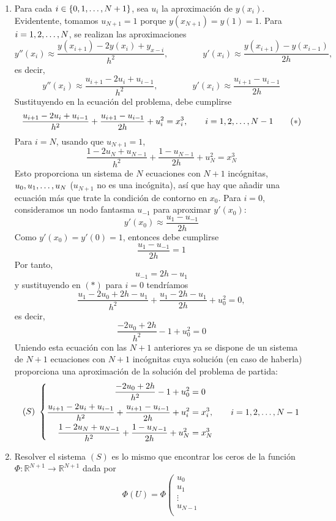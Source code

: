 \documentclass[11pt]{report}
\newcommand{\R}{\mathbb R}
\begin{document}
\begin{enumerate}
  \item  Para cada $i \in \{0,1,\mathellipsis,N+1\}$, sea $u_i$ la aproximación de $y(x_i)$. Evidentente, tomamos $u_{N+1}=1$ porque $y(x_{N+1})=y(1)=1$. Para $i =1,2,\mathellipsis,N$, se realizan las aproximaciones
  \[y''(x_i) \approx \frac{y(x_{i+1})-2y(x_i)+y_{x-i}}{h^2}, \qquad \qquad y'(x_i) \approx \frac{y(x_{i+1})-y(x_{i-1})}{2h},\]
  es decir,
  \[y''(x_i) \approx \frac{u_{i+1}-2u_i+u_{i-1}}{h^2}, \qquad \qquad y'(x_i) \approx \frac{u_{i+1}-u_{i-1}}{2h}\]
  Sustituyendo en la ecuación del problema, debe cumplirse
  \[\frac{u_{i+1}-2u_i+u_{i-1}}{h^2} + \frac{u_{i+1}-u_{i-1}}{2h} + u_i^2 = x_i^3, \qquad i =1,2,\mathellipsis,N-1 \tag{$\ast$}\]
  Para $i = N$, usando que $u_{N+1} = 1$,
  \[\frac{1-2u_N+u_{N-1}}{h^2} + \frac{1-u_{N-1}}{2h} + u_N^2 = x_N^3\]
  Esto proporciona un sistema de $N$ ecuaciones con $N+1$ incógnitas, $u_0,u_1,\mathellipsis,u_N$ ($u_{N+1}$ no es una incógnita), así que hay que añadir una ecuación más que trate la condición de contorno en $x_0$. Para $i = 0$, consideramos un nodo fantasma $u_{-1}$ para aproximar $y'(x_0)$:
  \[y'(x_0) \approx \frac{u_1-u_{-1}}{2h}\]
  Como $y'(x_0) = y'(0)=1$, entonces debe cumplirse
  \[\frac{u_1-u_{-1}}{2h} = 1\]
  Por tanto,
  \[u_{-1} = 2h-u_1\]
  y sustituyendo en $(\ast)$ para $i = 0$ tendríamos
  \[\frac{u_{1}-2u_0+2h-u_1}{h^2} + \frac{u_{1}-2h-u_1}{2h} + u_0^2 = 0,\]
  es decir,
  \[\frac{-2u_0+2h}{h^2} -1 + u_0^2 = 0\]
  Uniendo esta ecuación con las $N+1$ anteriores ya se dispone de un sistema de $N+1$ ecuaciones con $N+1$ incógnitas cuya solución (en caso de haberla) proporciona una aproximación de la solución del problema de partida:
  \[(S) \ \left\{ \begin{alignedat}{1}
    \frac{-2u_0+2h}{h^2} -1 + u_0^2 &= 0 \\
    \frac{u_{i+1}-2u_i+u_{i-1}}{h^2} + \frac{u_{i+1}-u_{i-1}}{2h} + u_i^2 &= x_i^3, \qquad i =1,2,\mathellipsis,N-1 \\
    \frac{1-2u_N+u_{N-1}}{h^2} + \frac{1-u_{N-1}}{2h} + u_N^2 &= x_N^3
  \end{alignedat} \right.\]
  \item Resolver el sistema $(S)$ es lo mismo que encontrar los ceros de la función $\Phi \colon \R^{N+1} \to \R^{N+1}$ dada por
  \[\Phi(U) = \Phi\left(\begin{array}{c}
    u_0 \\
    u_1 \\
    \vdots \\
    u_{N-1} \\

\end{array}\]
\end{enumerate}
\end{document}
